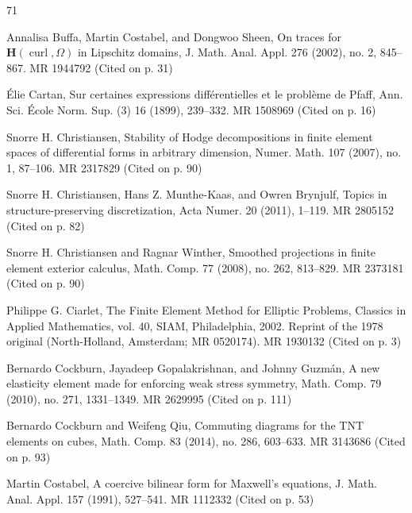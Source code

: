 \begin{MBSourceBibliography}{71}
\item\label{bib:source-26}Annalisa Buffa, Martin Costabel, and Dongwoo Sheen, On traces for $\mathbf H(\operatorname{curl},\Omega)$ in Lipschitz domains, J. Math. Anal. Appl. 276 (2002), no. 2, 845–867. MR 1944792 (Cited on p. 31)

\item\label{bib:source-27}\label{bib:cartan-differential-expressions}Élie Cartan, Sur certaines expressions différentielles et le problème de Pfaff, Ann. Sci. École Norm. Sup. (3) 16 (1899), 239–332. MR 1508969 (Cited on p. 16)

\item\label{bib:source-28}Snorre H. Christiansen, Stability of Hodge decompositions in finite element spaces of differential forms in arbitrary dimension, Numer. Math. 107 (2007), no. 1, 87–106. MR 2317829 (Cited on p. 90)

\item\label{bib:source-29}Snorre H. Christiansen, Hans Z. Munthe-Kaas, and Owren Brynjulf, \newline Topics in structure-preserving discretization, Acta Numer. 20 (2011), 1–119. MR 2805152 (Cited on p. 82)

\item\label{bib:source-30}Snorre H. Christiansen and Ragnar Winther, Smoothed projections in finite element exterior calculus, Math. Comp. 77 (2008), no. 262, 813–829. MR 2373181 (Cited on p. 90)

\item\label{bib:source-31}Philippe G. Ciarlet, The Finite Element Method for Elliptic Problems, Classics in Applied Mathematics, vol. 40, SIAM, Philadelphia, 2002. Reprint of the 1978 original (North-Holland, Amsterdam; MR 0520174). MR 1930132 (Cited on p. 3)

\item\label{bib:source-32}Bernardo Cockburn, Jayadeep Gopalakrishnan, and Johnny Guzmán, A new elasticity element made for enforcing weak stress symmetry, Math. Comp. 79 (2010), no. 271, 1331–1349. MR 2629995 (Cited on p. 111)

\item\label{bib:source-33}Bernardo Cockburn and Weifeng Qiu, Commuting diagrams for the TNT elements on cubes, Math. Comp. 83 (2014), no. 286, 603–633. MR 3143686 (Cited on p. 93)

\item\label{bib:source-34}Martin Costabel, A coercive bilinear form for Maxwell’s equations, J. Math. Anal. Appl. 157 (1991), 527–541. MR 1112332 (Cited on p. 53)


\end{MBSourceBibliography}
